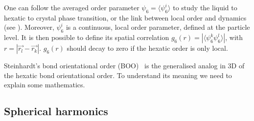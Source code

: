 One can follow the averaged order parameter $\psi_6= \langle \psi^{i}_{6} \rangle$ to study the liquid to hexatic to crystal phase transition, or the link between local order and dynamics (see ). Moreover, $\psi_{6}^{i}$ is a continuous, local order parameter, defined at the particle level. It is then possible to define its spatial correlation $g_6(r) = |\langle \psi_6^k \psi_{6}^{l} \rangle|$, with $r = |\vec{r_l} - \vec{r_k} |$. $g_6(r)$ should decay to zero if the hexatic order is only local.

Steinhardt's bond orientational order (BOO)~\citep{steinhardt1983boo} is the generalised analog in 3D of the hexatic bond orientational order. To understand its meaning we need to explain some mathematics.

\subsection{Spherical harmonics}

